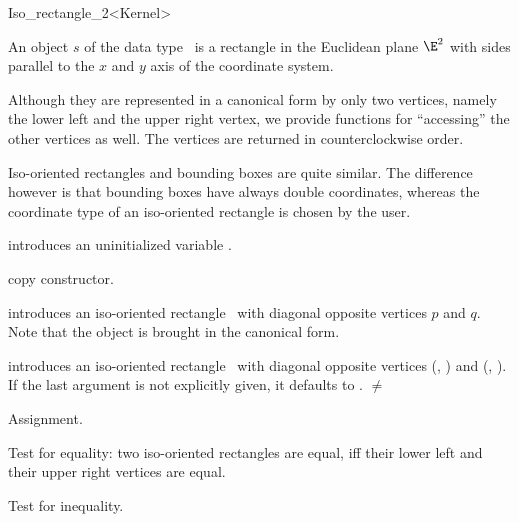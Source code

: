 \begin{ccRefClass} {Iso_rectangle_2<Kernel>}

\ccDefinition  An object $s$ of the data type \ccRefName\ is a
rectangle in the Euclidean plane $\E^2$ with sides parallel to the $x$ and
$y$ axis of the coordinate system.
 
Although they are represented in a canonical form by only two
vertices, namely the lower left and the upper right vertex, we provide
functions for ``accessing'' the other vertices as well. The vertices
are returned in counterclockwise order.

Iso-oriented rectangles and bounding boxes are quite similar. The
difference however is that bounding boxes have always double coordinates, 
whereas the coordinate type of an iso-oriented rectangle is chosen by
the user.

\ccCreation
{}


\ccHidden {}
             {introduces an uninitialized variable \ccVar.}

\ccHidden {}
 	    {copy constructor.}

            {introduces an iso-oriented rectangle \ccVar\ with diagonal
             opposite vertices $p$ and $q$. Note that the object is 
             brought in the canonical form.}

            {introduces an iso-oriented rectangle \ccVar\ with diagonal
             opposite vertices (, ) and 
             (, ).  If the last argument 
             is not explicitly given, it defaults to .
             \ccPrecond {} $\neq$  }

\ccOperations
\ccHidden {}
        {Assignment.}

       {Test for equality: two iso-oriented rectangles are equal, iff their
        lower left and their upper right vertices are equal.}

       {Test for inequality.}


\end{ccRefClass}
